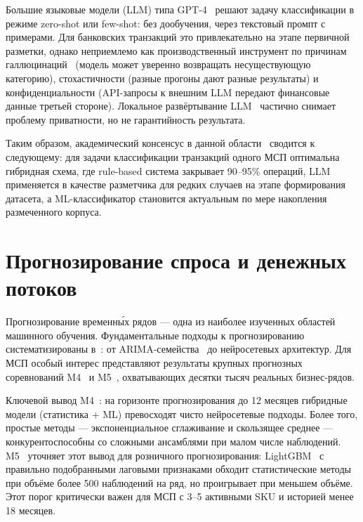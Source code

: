 Большие языковые модели (LLM) типа GPT-4~\cite{brown2020language} решают задачу классификации в режиме zero-shot или few-shot: без дообучения, через текстовый промпт с примерами. Для банковских транзакций это привлекательно на этапе первичной разметки, однако неприемлемо как производственный инструмент по причинам галлюцинаций~\cite{ji2023survey} (модель может уверенно возвращать несуществующую категорию), стохастичности (разные прогоны дают разные результаты) и конфиденциальности (API-запросы к внешним LLM передают финансовые данные третьей стороне). Локальное развёртывание LLM~\cite{brown2020language} частично снимает проблему приватности, но не гарантийность результата.

Таким образом, академический консенсус в данной области~\cite{aggarwal2012survey,sculley2015hidden,ji2023survey} сводится к следующему: для задачи классификации транзакций одного МСП оптимальна гибридная схема, где rule-based система закрывает 90--95\% операций, LLM применяется в качестве разметчика для редких случаев на этапе формирования датасета, а ML-классификатор становится актуальным по мере накопления размеченного корпуса.

\section{Прогнозирование спроса и денежных потоков}

Прогнозирование временны́х рядов --- одна из наиболее изученных областей машинного обучения. Фундаментальные подходы к прогнозированию систематизированы в~\cite{hyndman2021forecasting}: от ARIMA-семейства~\cite{box1970distribution} до нейросетевых архитектур. Для МСП особый интерес представляют результаты крупных прогнозных соревнований M4~\cite{makridakis2018m4} и M5~\cite{makridakis2022m5}, охватывающих десятки тысяч реальных бизнес-рядов.

Ключевой вывод M4~\cite{makridakis2018m4}: на горизонте прогнозирования до 12 месяцев гибридные модели (статистика + ML) превосходят чисто нейросетевые подходы. Более того, простые методы --- экспоненциальное сглаживание и скользящее среднее --- конкурентоспособны со сложными ансамблями при малом числе наблюдений. M5~\cite{makridakis2022m5} уточняет этот вывод для розничного прогнозирования: LightGBM~\cite{ke2017lightgbm} с правильно подобранными лаговыми признаками обходит статистические методы при объёме более 500 наблюдений на ряд, но проигрывает при меньшем объёме. Этот порог критически важен для МСП с 3--5 активными SKU и историей менее 18 месяцев.

